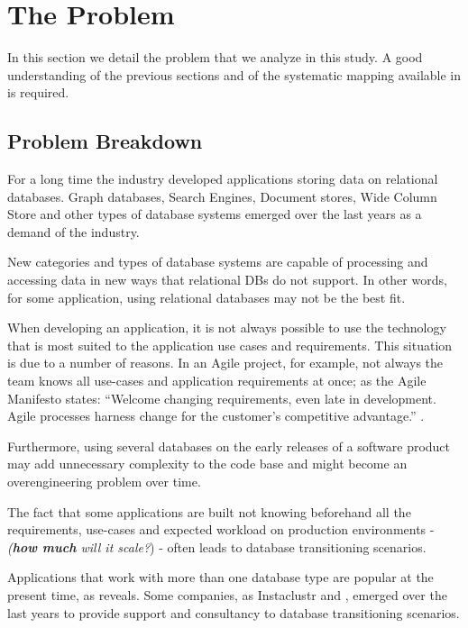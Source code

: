 \chapter{The Problem}\label{theProblemChap}
In this section we detail the problem that we analyze in this study. A good understanding of the previous sections and of the systematic mapping available in \cite{fabioMartinSM} is required.

\section{Problem Breakdown}

For a long time the industry developed applications storing data on relational databases. Graph databases, Search Engines, Document stores, Wide Column Store and other types of database systems emerged over the last years as a demand of the industry. 

New categories and types of database systems are capable of processing and accessing data in new ways that relational DBs do not support. In other words, for some application, using relational databases may not be the best fit. 

When developing an application, it is not always possible to use the technology that is most suited to the application use cases and requirements. This situation is due to a number of reasons. In an Agile project, for example, not always the team knows all use-cases and application requirements at once; as the Agile Manifesto states: ``Welcome changing requirements, even late in 
development. Agile processes harness change for 
the customer's competitive advantage.'' \cite{fowler2001agile}. 

Furthermore, using several databases on the early releases of a software product may add unnecessary complexity to the code base and might become an overengineering problem over time. 

The fact that some applications are built not knowing beforehand all the requirements, use-cases and expected workload on production environments - \textit{(\textbf{how much} will it scale?}) - often leads to database transitioning scenarios.

Applications that work with more than one database type are popular at the present time, as \cite{sadalage2012nosql} reveals. Some companies, as Instaclustr \cite{instaclustr} and \cite{elastic}, emerged over the last years to provide support and consultancy to database transitioning scenarios.

